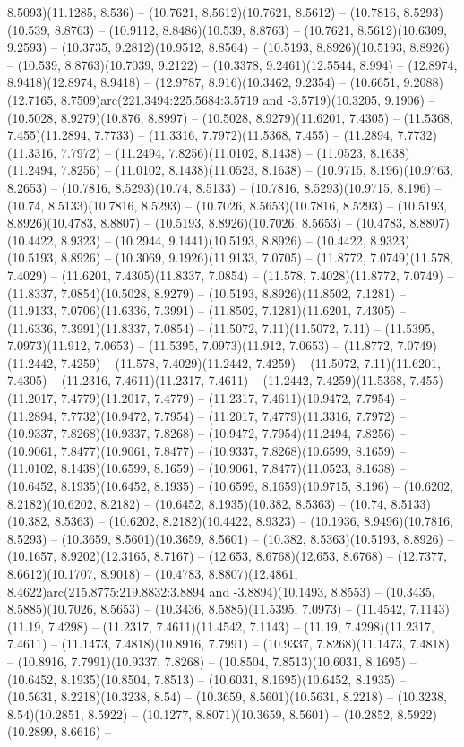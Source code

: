 8.5093)(11.1285, 8.536) -- (10.7621, 8.5612)(10.7621, 8.5612) -- (10.7816, 8.5293)(10.539, 8.8763) -- (10.9112, 8.8486)(10.539, 8.8763) -- (10.7621, 8.5612)(10.6309, 9.2593) -- (10.3735, 9.2812)(10.9512, 8.8564) -- (10.5193, 8.8926)(10.5193, 8.8926) -- (10.539, 8.8763)(10.7039, 9.2122) -- (10.3378, 9.2461)(12.5544, 8.994) -- (12.8974, 8.9418)(12.8974, 8.9418) -- (12.9787, 8.916)(10.3462, 9.2354) -- (10.6651, 9.2088)(12.7165, 8.7509)arc(221.3494:225.5684:3.5719 and -3.5719)(10.3205, 9.1906) -- (10.5028, 8.9279)(10.876, 8.8997) -- (10.5028, 8.9279)(11.6201, 7.4305) -- (11.5368, 7.455)(11.2894, 7.7733) -- (11.3316, 7.7972)(11.5368, 7.455) -- (11.2894, 7.7732)(11.3316, 7.7972) -- (11.2494, 7.8256)(11.0102, 8.1438) -- (11.0523, 8.1638)(11.2494, 7.8256) -- (11.0102, 8.1438)(11.0523, 8.1638) -- (10.9715, 8.196)(10.9763, 8.2653) -- (10.7816, 8.5293)(10.74, 8.5133) -- (10.7816, 8.5293)(10.9715, 8.196) -- (10.74, 8.5133)(10.7816, 8.5293) -- (10.7026, 8.5653)(10.7816, 8.5293) -- (10.5193, 8.8926)(10.4783, 8.8807) -- (10.5193, 8.8926)(10.7026, 8.5653) -- (10.4783, 8.8807)(10.4422, 8.9323) -- (10.2944, 9.1441)(10.5193, 8.8926) -- (10.4422, 8.9323)(10.5193, 8.8926) -- (10.3069, 9.1926)(11.9133, 7.0705) -- (11.8772, 7.0749)(11.578, 7.4029) -- (11.6201, 7.4305)(11.8337, 7.0854) -- (11.578, 7.4028)(11.8772, 7.0749) -- (11.8337, 7.0854)(10.5028, 8.9279) -- (10.5193, 8.8926)(11.8502, 7.1281) -- (11.9133, 7.0706)(11.6336, 7.3991) -- (11.8502, 7.1281)(11.6201, 7.4305) -- (11.6336, 7.3991)(11.8337, 7.0854) -- (11.5072, 7.11)(11.5072, 7.11) -- (11.5395, 7.0973)(11.912, 7.0653) -- (11.5395, 7.0973)(11.912, 7.0653) -- (11.8772, 7.0749)(11.2442, 7.4259) -- (11.578, 7.4029)(11.2442, 7.4259) -- (11.5072, 7.11)(11.6201, 7.4305) -- (11.2316, 7.4611)(11.2317, 7.4611) -- (11.2442, 7.4259)(11.5368, 7.455) -- (11.2017, 7.4779)(11.2017, 7.4779) -- (11.2317, 7.4611)(10.9472, 7.7954) -- (11.2894, 7.7732)(10.9472, 7.7954) -- (11.2017, 7.4779)(11.3316, 7.7972) -- (10.9337, 7.8268)(10.9337, 7.8268) -- (10.9472, 7.7954)(11.2494, 7.8256) -- (10.9061, 7.8477)(10.9061, 7.8477) -- (10.9337, 7.8268)(10.6599, 8.1659) -- (11.0102, 8.1438)(10.6599, 8.1659) -- (10.9061, 7.8477)(11.0523, 8.1638) -- (10.6452, 8.1935)(10.6452, 8.1935) -- (10.6599, 8.1659)(10.9715, 8.196) -- (10.6202, 8.2182)(10.6202, 8.2182) -- (10.6452, 8.1935)(10.382, 8.5363) -- (10.74, 8.5133)(10.382, 8.5363) -- (10.6202, 8.2182)(10.4422, 8.9323) -- (10.1936, 8.9496)(10.7816, 8.5293) -- (10.3659, 8.5601)(10.3659, 8.5601) -- (10.382, 8.5363)(10.5193, 8.8926) -- (10.1657, 8.9202)(12.3165, 8.7167) -- (12.653, 8.6768)(12.653, 8.6768) -- (12.7377, 8.6612)(10.1707, 8.9018) -- (10.4783, 8.8807)(12.4861, 8.4622)arc(215.8775:219.8832:3.8894 and -3.8894)(10.1493, 8.8553) -- (10.3435, 8.5885)(10.7026, 8.5653) -- (10.3436, 8.5885)(11.5395, 7.0973) -- (11.4542, 7.1143)(11.19, 7.4298) -- (11.2317, 7.4611)(11.4542, 7.1143) -- (11.19, 7.4298)(11.2317, 7.4611) -- (11.1473, 7.4818)(10.8916, 7.7991) -- (10.9337, 7.8268)(11.1473, 7.4818) -- (10.8916, 7.7991)(10.9337, 7.8268) -- (10.8504, 7.8513)(10.6031, 8.1695) -- (10.6452, 8.1935)(10.8504, 7.8513) -- (10.6031, 8.1695)(10.6452, 8.1935) -- (10.5631, 8.2218)(10.3238, 8.54) -- (10.3659, 8.5601)(10.5631, 8.2218) -- (10.3238, 8.54)(10.2851, 8.5922) -- (10.1277, 8.8071)(10.3659, 8.5601) -- (10.2852, 8.5922)(10.2899, 8.6616) -- 
